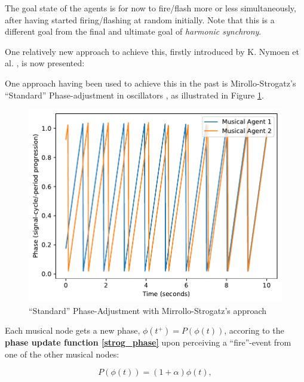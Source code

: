 			The goal state of the agents is for now to fire/flash more or less simultaneously, after having started firing/flashing at random initially. Note that this is a different goal from the final and ultimate goal of \textit{harmonic synchrony}.
			
			One relatively new approach to achieve this, firstly introduced by K. Nymoen et al. \cite{nymoen_synch}, is now presented:
			
			
			
			
			
			One approach having been used to achieve this in the past is Mirollo-Strogatz's ``Standard'' Phase-adjustment in oscillators \cite{mirollo_strogatz_PCO_synch}, as illustrated in Figure \ref{fig:strog_phase}.
					
			\begin{figure}[h]
				\centering
				\includegraphics[width=0.9\linewidth]{Assets/Figures/MirolloStrogatzPhaseAdjustment.pdf}
				\caption{``Standard'' Phase-Adjustment with Mirrollo-Strogatz's approach}
				\label{fig:strog_phase}
			\end{figure}
			
			Each musical node gets a new phase, $\phi(t^+) = P(\phi(t))$, accoring to the \textbf{phase update function \eqref{strog_phase}} upon perceiving a ``fire''-event from one of the other musical nodes:
			
			\begin{equation}\label{strog_phase}
			P(\phi(t)) = (1 + \alpha)\phi(t)	,
			\end{equation}
			
